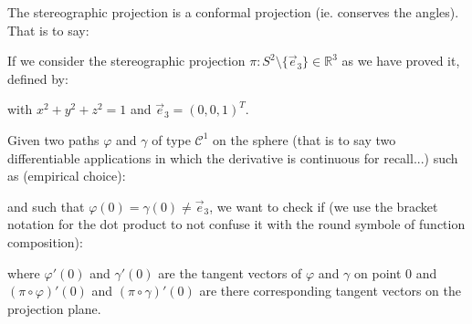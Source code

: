 	\begin{theorem}
	The stereographic projection is a conformal projection (ie. conserves the angles). That is to say:
	
	If we consider the stereographic projection $\pi:S^2 \setminus\{\vec{e}_3\}\in\mathbb{R}^3$ as we have proved it, defined by:
	
	with $x^2+y^2+z^2=1$ and $\vec{e}_3=(0,0,1)^T$.

	Given two paths $\varphi$ and $\gamma$ of type $\mathcal{C}^1$ on the sphere (that is to say two differentiable applications in which the derivative is continuous for recall...) such as (empirical choice):
	
	and such that $\varphi(0)=\gamma(0)\neq \vec{e}_3$, we want to check if (we use the bracket notation for the dot product to not confuse it with the round symbole of function composition):
	
	where $\varphi'(0)$ and $\gamma'(0)$ are the tangent vectors of $\varphi$ and $\gamma$ on point $0$ and $(\pi\circ\varphi)'(0)$ and $(\pi\circ\gamma)'(0)$ are there corresponding tangent vectors on the projection plane.
	\end{theorem}
